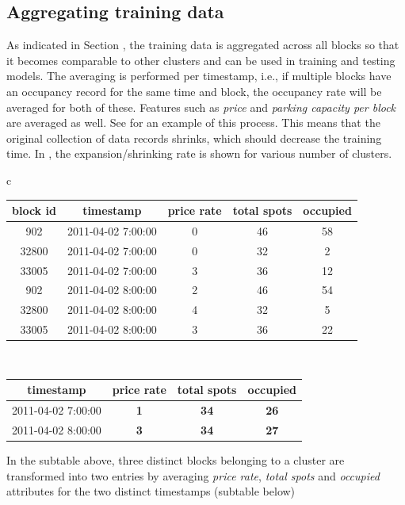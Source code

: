 \subsection{Aggregating training data}
\label{experimental_setup:aggregating_training_data}
As indicated in Section , the training data is aggregated across all blocks so that it becomes comparable to other clusters and can be used in training and testing models. The averaging is performed per timestamp, i.e., if multiple blocks have an occupancy record for the same time and block, the occupancy rate will be averaged for both of these. Features such as \textit{price} and \textit{parking capacity per block} are averaged as well. See  for an example of this process. This means that the original collection of data records shrinks, which should decrease the training time. In , the expansion/shrinking rate is shown for various number of clusters.

\begin{table}
	{\begin{tabular}{ c }
			\begin{tabular}{ | c | c | c | c | c |}
				\hline
				\textbf{block id} & \textbf{timestamp} & \textbf{price rate} & \textbf{total spots} & \textbf{occupied} \\ \hline
				902   & {2011-04-02 7:00:00} & 0 & 46 & 58 \\ \hline
				32800 & {2011-04-02 7:00:00} & 0 & 32 & 2 \\ \hline
				33005 & {2011-04-02 7:00:00} & 3 & 36 & 12 \\ \hline
				902   & {2011-04-02 8:00:00} & 2 & 46 & 54 \\ \hline
				32800 & {2011-04-02 8:00:00} & 4 & 32 & 5 \\ \hline
				33005 & {2011-04-02 8:00:00} & 3 & 36 & 22 \\ \hline
			\end{tabular} \\
			\colrule
			\begin{tabular}{ | c | c | c | c |}
				\hline
				\textbf{timestamp} & \textbf{price rate} & \textbf{total spots} & \textbf{occupied} \\ \hline
				{2011-04-02 7:00:00} & \textbf{1} & \textbf{34} & \textbf{26} \\ \hline
				{2011-04-02 8:00:00} & \textbf{3} & \textbf{34} & \textbf{27} \\ \hline
			\end{tabular}
	\end{tabular}}
	\begin{tabnote}
		In the subtable above, three distinct blocks belonging to a cluster are transformed into two entries by averaging \textit{price rate}, \textit{total spots} and \textit{occupied} attributes for the two distinct timestamps (subtable below)
	\end{tabnote}
	\label{tab:aggregating_datapoints}
\end{table}

